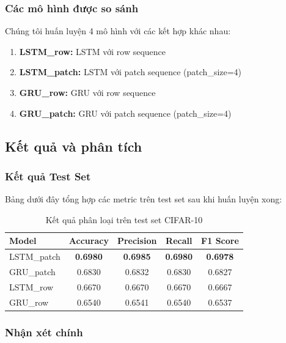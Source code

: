 \subsubsection{Các mô hình được so sánh}

Chúng tôi huấn luyện 4 mô hình với các kết hợp khác nhau:

\begin{enumerate}
    \item \textbf{LSTM\_row:} LSTM với row sequence
    \item \textbf{LSTM\_patch:} LSTM với patch sequence (patch\_size=4)
    \item \textbf{GRU\_row:} GRU với row sequence
    \item \textbf{GRU\_patch:} GRU với patch sequence (patch\_size=4)
\end{enumerate}

\subsection{Kết quả và phân tích}

\subsubsection{Kết quả Test Set}

Bảng dưới đây tổng hợp các metric trên test set sau khi huấn luyện xong:

\begin{table}[H]
    \centering
    \begin{tabular}{lcccc}
        \toprule
        \textbf{Model} & \textbf{Accuracy} & \textbf{Precision} & \textbf{Recall} & \textbf{F1 Score} \\
        \midrule
        LSTM\_patch & \textbf{0.6980} & \textbf{0.6985} & \textbf{0.6980} & \textbf{0.6978} \\
        GRU\_patch & 0.6830 & 0.6832 & 0.6830 & 0.6827 \\
        LSTM\_row & 0.6670 & 0.6670 & 0.6670 & 0.6667 \\
        GRU\_row & 0.6540 & 0.6541 & 0.6540 & 0.6537 \\
        \bottomrule
    \end{tabular}
    \caption{Kết quả phân loại trên test set CIFAR-10}
\end{table}

\subsubsection{Nhận xét chính}

